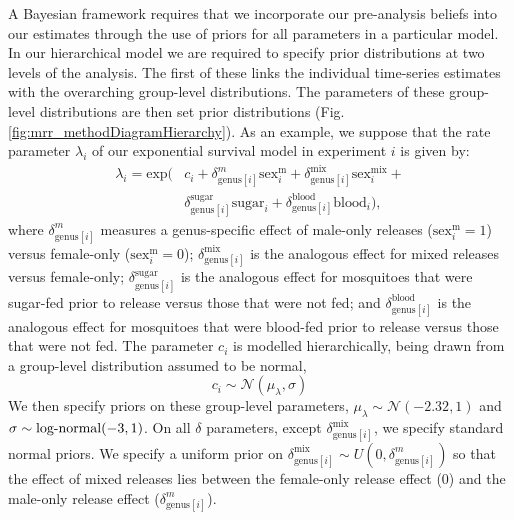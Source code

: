 \documentclass[12pt]{article}
\begin{document}
A Bayesian framework requires that we incorporate our pre-analysis beliefs into our estimates through the use of priors for all parameters in a particular model. In our hierarchical model we are required to specify prior distributions at two levels of the analysis. The first of these links the individual time-series estimates with the overarching group-level distributions. The parameters of these group-level distributions are then set prior distributions (Fig. \ref{fig:mrr_methodDiagramHierarchy}). As an example, we suppose that the rate parameter $\lambda_i$ of our exponential survival model in experiment $i$ is given by:
%
\begin{align}
\lambda_i = \text{exp}(&c_i + \delta^m_{\text{genus}[i]} \text{sex}^{\text{m}}_i + \delta^{\text{mix}}_{\text{genus}[i]} \text{sex}^{\text{mix}}_i +\\  & \delta^{\text{sugar}}_{\text{genus}[i]} \text{sugar}_i +  \delta^{\text{blood}}_{\text{genus}[i]} \text{blood}_i),
\end{align}
%
where $\delta^m_{\text{genus}[i]}$ measures a genus-specific effect of male-only releases ($\text{sex}^{\text{m}}_i=1$) versus female-only ($\text{sex}^{\text{m}}_i=0$); $\delta^{\text{mix}}_{\text{genus}[i]}$ is the analogous effect for mixed releases versus female-only; $\delta^{\text{sugar}}_{\text{genus}[i]}$ is the analogous effect for mosquitoes that were sugar-fed prior to release versus those that were not fed; and $\delta^{\text{blood}}_{\text{genus}[i]}$ is the analogous effect for mosquitoes that were blood-fed prior to release versus those that were not fed. The parameter $c_i$ is modelled hierarchically, being drawn from a group-level distribution assumed to be normal,
%
\begin{equation}
c_i \sim  \mathcal{N}(\mu_\lambda,\sigma)
\end{equation}
%
We then specify priors on these group-level parameters, $\mu_\lambda \sim \mathcal{N}(-2.32,1)$ and $\sigma \sim \textnormal{log-normal}(-3,1)$. On all $\delta$ parameters, except $\delta^{\text{mix}}_{\text{genus}[i]}$, we specify standard normal priors. We specify a uniform prior on $\delta^{\text{mix}}_{\text{genus}[i]}\sim U(0,\delta^m_{\text{genus}[i]})$ so that the effect of mixed releases lies between the female-only release effect (0) and the male-only release effect ($\delta^m_{\text{genus}[i]}$). 
\end{document}
